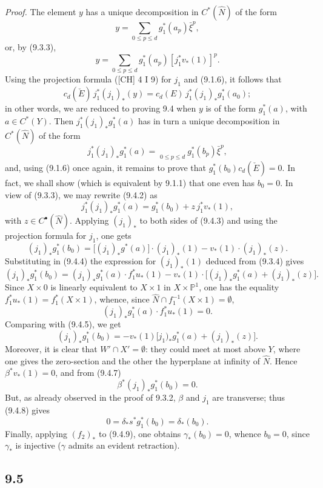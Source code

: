 \documentclass[11pt]{article}
\begin{document}
\emph{Proof.} The element $y$ has a unique decomposition in $C^*(\widehat N)$ of the form
\[
y=\sum_{0\le p\le d}g_1^*(a_p)\bar\xi^p,
\]
or, by (9.3.3),
\[
y=\sum_{0\le p\le d}g_1^*(a_p)[j_1^*v_*(1)]^p.
\tag{9.4.1}
\]
Using the projection formula ([CH] 4 I 9) for $j_1$ and (9.1.6), it follows that
\[
c_d(\check E)\,j_1^*(j_1)_*(y)=c_d( E)\,j_1^*(j_1)_*g_1^*(a_0);
\]
in other words, we are reduced to proving 9.4 when $y$ is of the form $g_1^*(a)$, with $a\in C^*(Y)$. Then $j_1^*(j_1)_*g_1^*(a)$ has in turn a unique decomposition in $C^*(\widehat N)$ of the form
\[
j_1^*(j_1)_*g_1^*(a)=\mathop{\phantom{\sum}}\limits_{0\le p\le d}g_1^*(b_p)\bar\xi^p,
\tag{9.4.2}
\]
and, using (9.1.6) once again, it remains to prove that $g_1^*(b_0)c_d(\check E)=0$. In fact, we shall show (which is equivalent by 9.1.1) that one even has $b_0=0$. In view of (9.3.3), we may rewrite (9.4.2) as
\[
j_1^*(j_1)_*g_1^*(a)=g_1^*(b_0)+z\,j_1^*v_*(1),
\tag{9.4.3}
\]
with $z\in C^{\bullet}(\widehat N)$. Applying $(j_1)_*$ to both sides of (9.4.3) and using the projection formula for $j_1$, one gets
\[
(j_1)_*g_1^*(b_0)=\bigl[(j_1)_*g^*(a)\bigr]\cdot(j_1)_*(1)-v_*(1)\cdot(j_1)_*(z).
\tag{9.4.4}
\]
Substituting in (9.4.4) the expression for $(j_1)_*(1)$ deduced from (9.3.4) gives
\[
(j_1)_*g_1^*(b_0)=
(j_1)_*g_1^*(a)\cdot f_1^*u_*(1)-v_*(1)\cdot\bigl[(j_1)_*g_1^*(a)+(j_1)_*(z)\bigr].
\tag{9.4.5}
\]
Since $X\times0$ is linearly equivalent to $X\times1$ in $X\times\mathbb P^1$, one has the equality $f_1^*u_*(1)=f_1^*(X\times1)$, whence, since $\widehat N\cap f_1^{-1}(X\times1)=\emptyset$,
\[
(j_1)_*g_1^*(a)\cdot f_1^*u_*(1)=0.
\tag{9.4.6}
\]
Comparing with (9.4.5), we get
\[
(j_1)_*g_1^*(b_0)=-v_*(1)\bigl[j_1)_*g_1^*(a)+(j_1)_*(z)\bigr].
\tag{9.4.7}
\]
Moreover, it is clear that $W'\cap X'=\emptyset$: they could meet at most above $Y$, where one gives the zero-section and the other the hyperplane at infinity of $\widehat N$. Hence $\beta^*v_*(1)=0$, and from (9.4.7)
\[
\beta^*(j_1)_*g_1^*(b_0)=0.
\tag{9.4.8}
\]
But, as already observed in the proof of 9.3.2, $\beta$ and $j_1$ are transverse; thus (9.4.8) gives
\[
0=\delta_*s^*g_1^*(b_0)=\delta_*(b_0).
\tag{9.4.9}
\]
Finally, applying $(f_2)_*$ to (9.4.9), one obtains $\gamma_*(b_0)=0$, whence $b_0=0$, since $\gamma_*$ is injective ($\gamma$ admits an evident retraction).

\subsection*{9.5}
\end{document}
